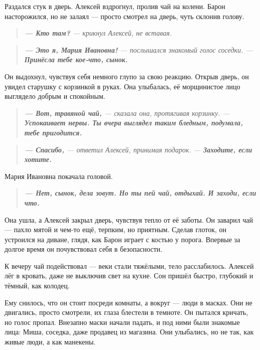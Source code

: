 \documentclass[12pt,a4paper]{book}
\newenvironment{dialogue}{\begin{quote}\itshape}{\end{quote}} %
\begin{document}
Раздался стук в дверь. Алексей вздрогнул, пролив чай на колени. Барон насторожился, но не залаял --- просто смотрел на дверь, чуть склонив голову.

\begin{dialogue}
\textbf{--- Кто там?} --- крикнул Алексей, не вставая.
\end{dialogue}

\begin{dialogue}
\textbf{--- Это я, Мария Ивановна!} --- послышался знакомый голос соседки. --- \textbf{Принёсла тебе кое-что, сынок.}
\end{dialogue}

Он выдохнул, чувствуя себя немного глупо за свою реакцию. Открыв дверь, он увидел старушку с корзинкой в руках. Она улыбалась, её морщинистое лицо выглядело добрым и спокойным.

\begin{dialogue}
\textbf{--- Вот, травяной чай,} --- сказала она, протягивая корзинку. --- \textbf{Успокаивает нервы. Ты вчера выглядел таким бледным, подумала, тебе пригодится.}
\end{dialogue}

\begin{dialogue}
\textbf{--- Спасибо,} --- ответил Алексей, принимая подарок. --- \textbf{Заходите, если хотите.}
\end{dialogue}

Мария Ивановна покачала головой.

\begin{dialogue}
\textbf{--- Нет, сынок, дела зовут. Но ты пей чай, отдыхай. И заходи, если что.}
\end{dialogue}

Она ушла, а Алексей закрыл дверь, чувствуя тепло от её заботы. Он заварил чай --- пахло мятой и чем-то ещё, терпким, но приятным. Сделав глоток, он устроился на диване, глядя, как Барон играет с костью у порога. Впервые за долгое время он почувствовал себя в безопасности.

К вечеру чай подействовал --- веки стали тяжёлыми, тело расслабилось. Алексей лёг в кровать, даже не выключив свет на кухне. Сон пришёл быстро, глубокий и тёмный, как колодец.

Ему снилось, что он стоит посреди комнаты, а вокруг --- люди в масках. Они не двигались, просто смотрели, их глаза блестели в темноте. Он пытался кричать, но голос пропал. Внезапно маски начали падать, и под ними были знакомые лица: Миша, соседка, даже продавец из магазина. Они улыбались, но не так, как живые люди, а как манекены.
\end{document}
